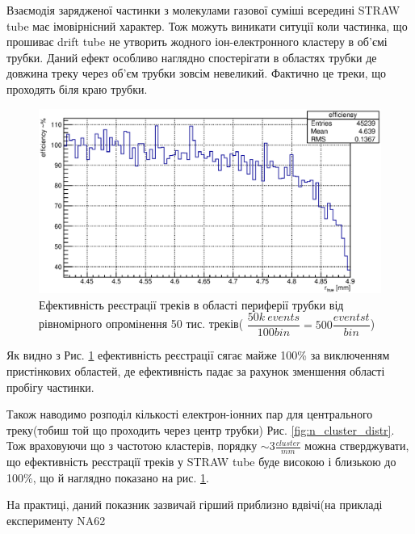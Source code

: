 \documentclass[]{article}
\begin{document}
	Взаємодія зарядженої частинки з молекулами газової суміші всередині STRAW tube має імовірнісний характер. Тож можуть виникати ситуції коли частинка, що прошиває drift tube не утворить жодного іон-електронного кластеру в об’ємі трубки. Даний ефект особливо наглядно спостерігати в областях трубки де довжина треку через об’єм трубки зовсім невеликий. Фактично це  треки, що проходять біля краю трубки.
	
	\begin{figure}
	\includegraphics[width=\textwidth]{periffEff}
	\caption{Ефективність реєстрації треків в області периферії трубки від рівномірного опромінення 50 тис. треків( $\dfrac{50k~events}{100 bin}  = 500 \dfrac{eventst}{bin}$)}
	\label{fig:efficiency}
	\end{figure}
	
	Як видно з Рис. \ref{fig:efficiency} ефективність реєстрації сягає майже 100\% за виключенням пристінкових областей, де ефективність падає за рахунок зменшення області пробігу частинки.
	
	Також наводимо розподіл кількості електрон-іонних пар для центрального треку(тобиш той що проходить через центр трубки) Рис. \ref{fig:n_cluster_distr}. Тож враховуючи що з частотою кластерів, порядку $\sim 3 \frac{cluster}{mm}$ можна стверджувати, що ефективність реєстрації треків у STRAW tube буде високою і близькою до 100\%, що й наглядно показано на рис. \ref{fig:efficiency}.
	
	Hа практиці, даний показник зазвичай гірший приблизно вдвічі(на прикладі експерименту NA62 \cite{}
	 
\end{document}

